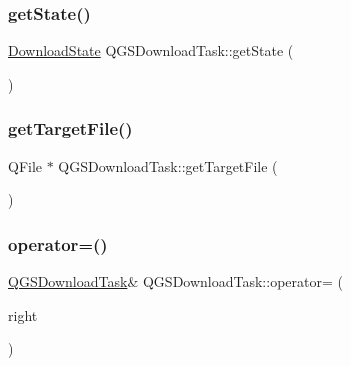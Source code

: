 \mbox{\label{class_q_g_s_download_task_a89a8047ceebee36c4d2c6672a2056dc0}} 
\subsubsection{\texorpdfstring{get\+State()}{getState()}}
{\footnotesize\ttfamily \mbox{\hyperlink{_q_g_s_download_task_8h_a94e6cd327cf2fc9490b4c797c7023a6e}{Download\+State}} Q\+G\+S\+Download\+Task\+::get\+State (\begin{DoxyParamCaption}{ }\end{DoxyParamCaption})}

\mbox{\label{class_q_g_s_download_task_a766b7bcd0bc8a38364556720089e17fd}} 
\subsubsection{\texorpdfstring{get\+Target\+File()}{getTargetFile()}}
{\footnotesize\ttfamily Q\+File $\ast$ Q\+G\+S\+Download\+Task\+::get\+Target\+File (\begin{DoxyParamCaption}{ }\end{DoxyParamCaption})}

\mbox{\label{class_q_g_s_download_task_ad93764847291d6e3f23d7d26b4798de8}} 
\subsubsection{\texorpdfstring{operator=()}{operator=()}\hspace{0.1cm}{\footnotesize\ttfamily [1/2]}}
{\footnotesize\ttfamily \mbox{\hyperlink{class_q_g_s_download_task}{Q\+G\+S\+Download\+Task}}\& Q\+G\+S\+Download\+Task\+::operator= (\begin{DoxyParamCaption}\item[{const \mbox{\hyperlink{class_q_g_s_download_task}{Q\+G\+S\+Download\+Task}} \&}]{right }\end{DoxyParamCaption})\hspace{0.3cm}{\ttfamily [delete]}}

